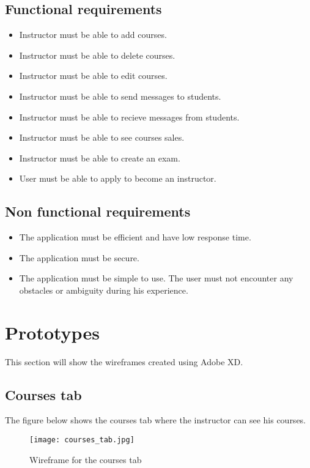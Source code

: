 \subsection{Functional requirements}
\begin{itemize}
    \item[\ding{81}] Instructor must be able to add courses.
    \item[\ding{81}] Instructor must be able to delete courses.
    \item[\ding{81}] Instructor must be able to edit courses.
    \item[\ding{81}] Instructor must be able to send messages to students.
    \item[\ding{81}] Instructor must be able to recieve messages from students.
    \item[\ding{81}] Instructor must be able to see courses sales.
    \item[\ding{81}] Instructor must be able to create an exam.
    \item[\ding{81}] User must be able to apply to become an instructor.
\end{itemize}
\subsection{Non functional requirements}
\begin{itemize}
    \item[\ding{81}] The application must be efficient and have low response time.
    \item[\ding{81}] The application must be secure.
    \item[\ding{81}] The application must be simple to use. The user must not encounter any obstacles or ambiguity during his experience.
\end{itemize}

\section{Prototypes}
This section will show the wireframes created using Adobe XD.

\subsection{Courses tab}

The figure below shows the courses tab where the instructor can see his courses.

\begin{figure}[!ht]
    \centering
    \texttt{[image: courses\_tab.jpg]}
    \caption{Wireframe for the courses tab}
    \label{fig:courses_tab}
\end{figure}


